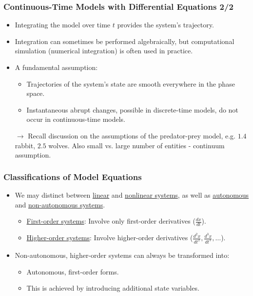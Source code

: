 \documentclass{beamer}
\begin{document}
\begin{frame}
\frametitle{Continuous-Time Models with Differential Equations 2/2}

\begin{itemize}
    \item Integrating the model over time \(t\) provides the system's trajectory.
    \item Integration can sometimes be performed algebraically, but computational simulation (numerical integration) is often used in practice.
    \item A fundamental assumption:
    \begin{itemize}
        \item Trajectories of the system's state are smooth everywhere in the phase space.
        \item Instantaneous abrupt changes, possible in discrete-time models, do not occur in continuous-time models.
    \end{itemize}
    $\rightarrow$ Recall discussion on the assumptions of the  predator-prey model, e.g. $1.4$ rabbit, $2.5$ wolves. Also small vs. large number of entities - continuum assumption.
\end{itemize}

\end{frame}

\begin{frame}
\frametitle{Classifications of Model Equations}

\begin{itemize}
    \item We may distinct between \underline{linear} and \underline{nonlinear systems}, as well as \underline{autonomous} and \underline{non-autonomous systems}.
    \begin{itemize}
        \item \underline{First-order systems}: Involve only first-order derivatives (\(\frac{dx}{dt}\)).
        \item \underline{Higher-order systems}: Involve higher-order derivatives (\(\frac{d^2x}{dt^2}, \frac{d^3x}{dt^3}, \ldots\)).
    \end{itemize}
    \item Non-autonomous, higher-order systems can always be transformed into:
    \begin{itemize}
        \item Autonomous, first-order forms.
        \item This is achieved by introducing additional state variables.
    \end{itemize}
\end{itemize}

\end{frame}
\end{document}
